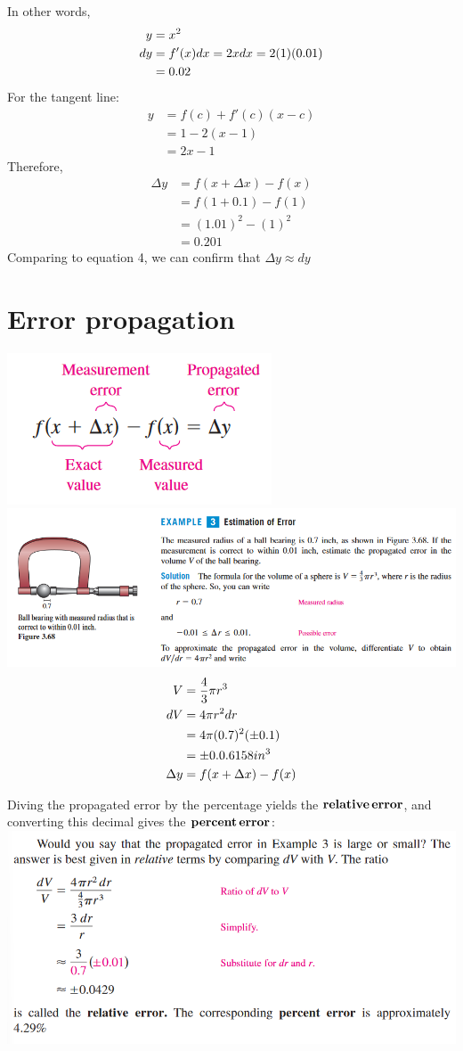 \documentclass[11pt]{article}
\newcommand*{\set}{\setcounter{equation}{0}}
\begin{document}
In other words,
\begin{align}
    \set
    y&=x^2\\
    dy&=f'(x)dx=2xdx=2(1)(0.01)\\
    &=0.02\\
\end{align}
For the tangent line:
\begin{align}
    y&=f(c)+f'(c)(x-c)\\
    &=1-2(x-1)\\
    &=2x-1
\end{align}
Therefore,
\begin{align}
    \Delta y&=f(x+\Delta x)-f(x)\\
    &=f(1+0.1)-f(1)\\
    &=(1.01)^2-(1)^2\\
    &=0.201
\end{align}
Comparing to equation 4, we can confirm that $\Delta y \approx dy$

\section{Error propagation}
\includegraphics{prop.png}\\
\includegraphics[scale=0.75]{ex3.png}
\begin{align}
    \set
    V&=\frac{4}{3}\pi r^3\\
    dV&=4\pi r^2dr\\
    &=4\pi (0.7)^2(\pm 0.1)\\
    &=\pm 0.0.6158 in^3\\
    \Delta y&=f(x+\Delta x)-f(x)
\end{align}

Diving the propagated error by the percentage yields the $\bold{relative\, error}$, and converting this decimal gives the $\bold{percent\,error}$:\\
\includegraphics[scale=0.75]{repe.png}
\end{document}
